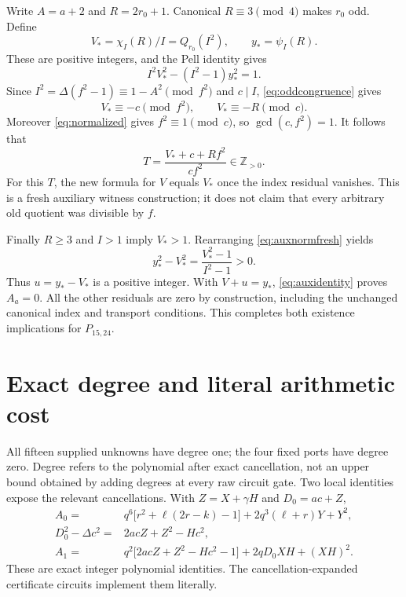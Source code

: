 \documentclass[11pt,a4paper]{article}
\theoremstyle{remark}
\newcommand{\Zp}{\mathbb Z_{>0}}
\newcommand{\Ptwo}{P_{15,24}}
\begin{document}
Write $A=a+2$ and $R=2r_0+1$. Canonical $R\equiv3\pmod4$ makes $r_0$
odd. Define
\begin{equation}
 V_* = \chi_I(R)/I=Q_{r_0}(I^2),\qquad y_* = \psi_I(R).
 \label{eq:auxfresh}
\end{equation}
These are positive integers, and the Pell identity gives
\begin{equation}
 I^2V_*^2-(I^2-1)y_*^2=1.
 \label{eq:auxnormfresh}
\end{equation}
Since $I^2=\Delta(f^2-1)\equiv1-A^2\pmod{f^2}$ and $c\mid I$,
\eqref{eq:oddcongruence} gives
\[
 V_*\equiv-c\pmod{f^2},\qquad V_*\equiv-R\pmod c.
\]
Moreover \eqref{eq:normalized} gives $f^2\equiv1\pmod c$, so
$\gcd(c,f^2)=1$. It follows that
\begin{equation}
 T=\frac{V_*+c+Rf^2}{cf^2}\in\Zp.
 \label{eq:newT}
\end{equation}
For this $T$, the new formula for $V$ equals $V_*$ once the index residual
vanishes. This is a fresh auxiliary witness construction; it does not
claim that every arbitrary old quotient was divisible by $f$.

Finally $R\ge3$ and $I>1$ imply $V_*>1$. Rearranging
\eqref{eq:auxnormfresh} yields
\[
 y_*^2-V_*^2=\frac{V_*^2-1}{I^2-1}>0.
\]
Thus $u=y_*-V_*$ is a positive integer. With $V+u=y_*$,
\eqref{eq:auxidentity} proves $A_a=0$. All the other residuals are zero
by construction, including the unchanged canonical index and transport
conditions. This completes both existence implications for $\Ptwo$.

\section{Exact degree and literal arithmetic cost}
\label{sec:degree}

All fifteen supplied unknowns have degree one; the four fixed ports have
degree zero. Degree refers to the polynomial after exact cancellation,
not an upper bound obtained by adding degrees at every raw circuit gate.
Two local identities expose the relevant cancellations. With
$Z=X+\gamma H$ and $D_0=ac+Z$,
\begin{align}
 A_0={}&q^6\bigl[r^2+\ell(2r-k)-1\bigr]
       +2q^3(\ell+r)Y+Y^2,\label{eq:firstcancel}\\
 D_0^2-\Delta c^2={}&2acZ+Z^2-Hc^2,\label{eq:maincancel}\\
 A_1={}&q^2\bigl[2acZ+Z^2-Hc^2-1\bigr]
             +2qD_0XH+(XH)^2.\label{eq:clearcancel}
\end{align}
These are exact integer polynomial identities. The cancellation-expanded
certificate circuits implement them literally.
\end{document}
